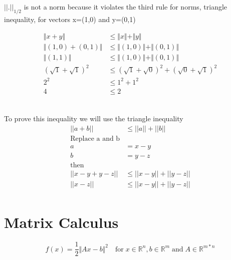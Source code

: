 \documentclass[12pt]{article}         %
\begin{document}
\subsection{}
$\vert$$\vert$.$\vert$$\vert_{1/2}$ is not a norm because it violates the third rule for norms, triangle inequality, for vectors x=(1,0) and y=(0,1)

$$
\begin{aligned}
\Vert x+y\Vert &\leq\Vert x\Vert  +\Vert y\Vert \\
\Vert (1, 0) + (0, 1)\Vert &\leq \Vert (1, 0)\Vert  + \Vert (0, 1)\Vert \\
\Vert (1, 1)\Vert &\leq \Vert (1, 0)\Vert  + \Vert (0, 1)\Vert \\
(\sqrt{1} + \sqrt{1})^2&\leq (\sqrt{1} + \sqrt{0})^2 + (\sqrt{0} + \sqrt{1})^2\\
2^2 &\leq 1^2 + 1^2\\
4 &\leq 2\\
\end{aligned}
$$

\subsection{}
To prove this inequality we will use the triangle inequality
$$
\begin{aligned}
||a + b||&\leq ||a|| + ||b||\\
\text{Replace a and b}\\ a &= x-y\\ b &= y-z\\ \text{then}\\
||x - y + y - z||&\leq ||x-y|| + ||y-z||\\
||x - z||&\leq ||x-y|| + ||y-z||\\
\end{aligned}
$$





\section{Matrix Calculus}

\begin{equation}
	f(x) = \dfrac{1}{2}\Vert Ax - b\Vert^2 \quad\text{for}\; x\in \mathbb{R} ^n ,b\in \mathbb{R}^m \;\text{and}\; A\in\mathbb{R}^{m*n}
\end{equation}
\end{document}

